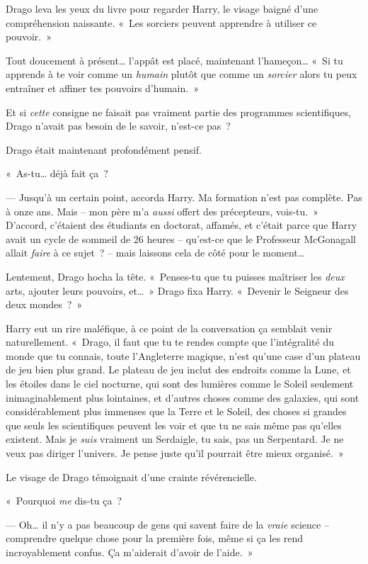 Drago leva les yeux du livre pour regarder Harry, le visage baigné d'une compréhension naissante. «~Les sorciers peuvent apprendre à utiliser ce pouvoir.~»

Tout doucement à présent… l'appât est placé, maintenant l'hameçon…
«~Si tu apprends à te voir comme un \emph{humain} plutôt que comme un \emph{sorcier} alors tu peux entraîner et affiner tes pouvoirs d'humain.~»

Et si \emph{cette} consigne ne faisait pas vraiment partie des programmes scientifiques, Drago n'avait pas besoin de le savoir, n'est-ce pas~?

Drago était maintenant profondément pensif.

«~As-tu… déjà fait ça~?


--- Jusqu'à un certain point, accorda Harry. Ma formation n'est pas complète. Pas à onze ans. Mais -- mon père m'a \emph{aussi} offert des précepteurs, vois-tu.~» D'accord, c'étaient des étudiants en doctorat, affamés, et c'était parce que Harry avait un cycle de sommeil de 26 heures -- qu'est-ce que le Professeur McGonagall allait \emph{faire} à ce sujet~? -- mais laissons cela de côté pour le moment…

Lentement, Drago hocha la tête. «~Penses-tu que tu puisses maîtriser les \emph{deux} arts, ajouter leurs pouvoirs, et…~» Drago fixa Harry. «~Devenir le Seigneur des deux mondes~?~»

Harry eut un rire maléfique, à ce point de la conversation ça semblait venir naturellement. «~Drago, il faut que tu te rendes compte que l'intégralité du monde que tu connais, toute l'Angleterre magique, n'est qu'une case d'un plateau de jeu bien plus grand. Le plateau de jeu inclut des endroits comme la Lune, et les étoiles dans le ciel nocturne, qui sont des lumières comme le Soleil seulement inimaginablement plus lointaines, et d'autres choses comme des galaxies, qui sont considérablement plus immenses que la Terre et le Soleil, des choses si grandes que seuls les scientifiques peuvent les voir et que tu ne sais même pas qu'elles existent. Mais je \emph{suis} vraiment un Serdaigle, tu sais, pas un Serpentard. Je ne veux pas diriger l'univers. Je pense juste qu'il pourrait être mieux organisé.~»

Le visage de Drago témoignait d'une crainte révérencielle.

«~Pourquoi \emph{me} dis-tu ça~?

--- Oh… il n'y a pas beaucoup de gens qui savent faire de la \emph{vraie} science -- comprendre quelque chose pour la première fois, même si ça les rend incroyablement confus. Ça m'aiderait d'avoir de l'aide.~»

